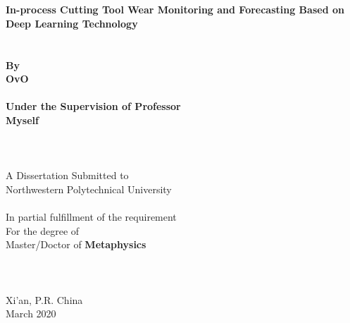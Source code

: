 \begin{titlepage}
	\fTNR
    \begin{spacing}{1.2}
    	\begin{center}
    		\renewcommand{\baselinestretch}{1.2}
    		\renewcommand{\captionfont}{\linespread{1.2}\normalsize}
    		\setmainfont{\TNRFag}
    		\sSanhao ~ \\
    		\sSanhao ~ \\
    		\fTNR \sErhao  \textbf{In-process Cutting Tool Wear Monitoring and Forecasting Based on Deep Learning Technology}
    		\fSong \sXiaoer ~ \\
    		\fSong \sXiaoer ~ \\
    		\fSong \sXiaoer ~ \\
    		\fTNR \sXiaosan \textbf{By}\\
    		\fTNR \sXiaosan \textbf{OvO}\\
    		\fSong \sXiaosan ~ \\
    		\fTNR \sXiaosan \textbf{Under the Supervision of Professor}\\
    		\fTNR \sXiaosan \textbf{Myself}
    		\fSong \sSanhao ~ \\
    		\fSong \sSanhao ~ \\
    		\fSong \sSanhao ~ \\
    		\fSong \sSanhao ~ \\
    		\fTNR \sXiaosan A Dissertation Submitted to\\
    		\fTNR \sXiaosan Northwestern Polytechnical University \\
    		\fSong \sSanhao ~ \\
    		\fTNR In partial fulfillment of the requirement \\
			\fTNR For the degree of \\
    		\fTNR Master/Doctor of \textbf{Metaphysics}
    		\fSong \sXiaosan ~\\
    		\fSong \sXiaosan ~\\
    		\fSong \sXiaosan ~\\
    		\fSong \sXiaosan ~\\
    		\fTNR \sXiaosan Xi'an, P.R. China \\
    		\fTNR \sXiaosan March 2020
    	\end{center}
    \end{spacing}
    
\end{titlepage}
\fSong \normalsize

\endinput